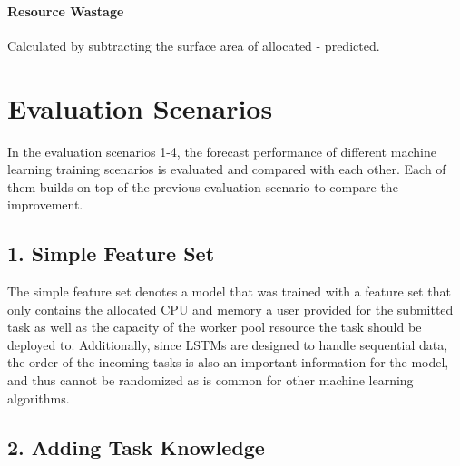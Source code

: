 
    \paragraph{Resource Wastage}
    \label{par:resource-wastage-metric-evaluation}
      Calculated by subtracting the surface area of allocated - predicted.

\section{Evaluation Scenarios}
\label{sec:evaluation-scenarios}

    In the evaluation scenarios 1-4, the forecast performance of different machine learning training scenarios is evaluated and compared with each other. Each of them builds on top of the previous evaluation scenario to compare the improvement.

  \subsection{1. Simple Feature Set}
  \label{sec:simple-feature-set-evaluation-scenarios}
    
    The simple feature set denotes a  model that was trained with a feature set that only contains the allocated CPU and memory a user provided for the submitted task as well as the capacity of the worker pool resource the task should be deployed to. Additionally, since LSTMs are designed to handle sequential data, the order of the incoming tasks is also an important information for the model, and thus cannot be randomized as is common for other machine learning algorithms.

  \subsection{2. Adding Task Knowledge}
  \label{sec:adding-task-knowledge-evaluation-scenarios}

